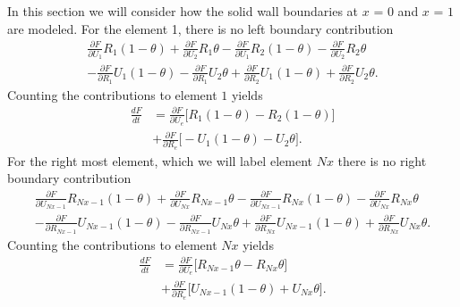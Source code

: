 \documentclass[a4paper,11pt]{article}
\begin{document}
In this section we will consider  how the solid wall boundaries at $x$ = 0 and $x$ = $1$ are modeled. For the element 1, there is no left boundary contribution
\begin{equation}
\begin{aligned}
\frac{\partial F}{\partial U_{1}}R_{1}(1-\theta) + \frac{\partial F}{\partial U_{2}}R_{1}\theta - \frac{\partial F}{\partial U_{1}}R_{2}(1-\theta) -\frac{\partial F}{\partial U_{2}}R_{2}\theta\\
-\frac{\partial F}{\partial R_{1}}U_{1}(1-\theta) -\frac{\partial F}{\partial R_{1}}U_{2}\theta +\frac{\partial F}{\partial R_{2}}U_{1}(1-\theta) +\frac{\partial F}{\partial R_{2}}U_{2}\theta.
\end{aligned}
\end{equation}
Counting the contributions to element $1$ yields
\begin{equation}
\begin{aligned}
\frac{d F}{d t} &=\frac{\partial F}{\partial U_{e}}\bigg [    R_{1}(1-\theta) - R_{2}(1-\theta)                         \bigg]\\
&+\frac{\partial F}{\partial R_{e}}\bigg [     - U_{1}(1-\theta)    - U_{2}\theta        \bigg].
\end{aligned}
\end{equation}
For the right most element, which we will label element $Nx$ there is no right boundary contribution
\begin{equation}
\begin{aligned}
 \frac{\partial F}{\partial U_{Nx-1}}R_{Nx-1}(1-\theta) + \frac{\partial F}{\partial U_{Nx}}R_{Nx-1}\theta - \frac{\partial F}{\partial U_{Nx-1}}R_{Nx}(1-\theta) -\frac{\partial F}{\partial U_{Nx}}R_{Nx}\theta\\
-\frac{\partial F}{\partial R_{Nx-1}}U_{Nx-1}(1-\theta) -\frac{\partial F}{\partial R_{Nx-1}}U_{Nx}\theta +\frac{\partial F}{\partial R_{Nx}}U_{Nx-1}(1-\theta) +\frac{\partial F}{\partial R_{Nx}}U_{Nx}\theta.
\end{aligned}
\end{equation}
Counting the contributions to element $Nx$ yields
\begin{equation}
\begin{aligned}
\frac{d F}{d t}&=\frac{\partial F}{\partial U_{e}}\bigg [    R_{Nx-1}\theta - R_{Nx}\theta                  \bigg]\\
&+\frac{\partial F}{\partial R_{e}}\bigg [    U_{Nx-1}(1-\theta)   + U_{Nx}\theta           \bigg].
\end{aligned}
\end{equation}
\end{document}
